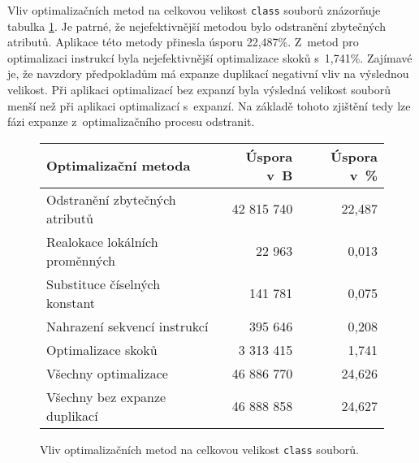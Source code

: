 Vliv optimalizačních metod na celkovou velikost \texttt{class} souborů znázorňuje tabulka \ref{tab:sizes}. Je patrné, že nejefektivnější metodou bylo odstranění zbytečných atributů. Aplikace této metody přinesla úsporu 22,487\%. Z~metod pro optimalizaci instrukcí byla nejefektivnější optimalizace skoků s~1,741\%. Zajímavé je, že navzdory předpokladům má expanze duplikací negativní vliv na výslednou velikost. Při aplikaci optimalizací bez expanzí byla výsledná velikost souborů menší než při aplikaci optimalizací s~expanzí. Na základě tohoto zjištění tedy lze fázi expanze z~optimalizačního procesu odstranit.

\begin{figure}
\begin{center}
  \begin{tabular}{l r r} \hline

\textbf{Optimalizační metoda}	&	\textbf{Úspora v~B}	&	\textbf{Úspora v~\%}	\\\hline
Odstranění zbytečných atributů			&	42 815 740			&	22,487			\\
Realokace lokálních proměnných					&	22 963	&			0,013	\\
Substituce číselných konstant					&	141 781	&			0,075	\\
Nahrazení sekvencí instrukcí					&	395 646	&			0,208	\\
Optimalizace skoků					&	3 313 415	&			1,741	\\
Všechny optimalizace			&	46 886 770			&	24,626			\\
Všechny bez expanze duplikací			&	46 888 858			&	24,627			\\\hline

  \end{tabular}
\end{center}
\caption{Vliv optimalizačních metod na celkovou velikost \texttt{class} souborů.}
\label{tab:sizes}
\end{figure}
          

